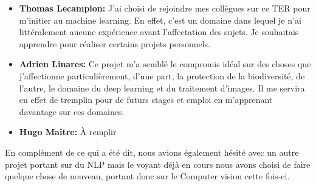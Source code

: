 \documentclass[12pt,a4paper]{report}
\begin{document}
\begin{spacing}{1.5}
\vspace{1em}

\begin{itemize}

\item \textbf{Thomas Lecampion:} J’ai choisi de rejoindre mes collègues sur ce TER pour m’initier au machine learning. En effet, c’est un domaine dans lequel je n’ai littéralement aucune expérience avant l’affectation des sujets. Je souhaitais apprendre pour réaliser certains projets personnels. \\

\item \textbf{Adrien Linares:} Ce projet m’a semblé le compromis idéal sur des choses que j'affectionne particulièrement, d’une part, la protection de la biodiversité, de l’autre, le domaine du deep learning et du traitement d’images. Il me servira en effet de tremplin pour de futurs stages et emploi en m’apprenant davantage sur ces domaines. 
  \\

\item \textbf{Hugo Maître:} À remplir \\

\end{itemize}
En complément de ce qui a été dit, nous avions également hésité avec un autre projet portant sur du NLP mais le voyant déjà en cours nous avons choisi de faire quelque chose de nouveau, portant donc sur le Computer vision cette fois-ci.

\end{spacing}
\end{document}

